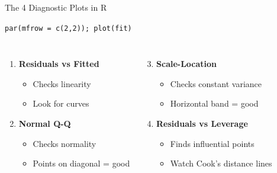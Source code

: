 \documentclass[aspectratio=169, 11pt]{beamer}
\begin{document}
\begin{frame}{The 4 Diagnostic Plots in R}

\texttt{par(mfrow = c(2,2)); plot(fit)}

\vspace{0.5em}
\begin{columns}
\begin{enumerate}
  \item \textbf{Residuals vs Fitted}
  \begin{itemize}
    \item[$\circ$] Checks linearity
    \item[$\circ$] Look for curves
  \end{itemize}

  \vspace{0.4em}
  \item \textbf{Normal Q-Q}
  \begin{itemize}
    \item[$\circ$] Checks normality
    \item[$\circ$] Points on diagonal = good
  \end{itemize}
\end{enumerate}

\begin{enumerate}
  \setcounter{enumi}{2}
  \item \textbf{Scale-Location}
  \begin{itemize}
    \item[$\circ$] Checks constant variance
    \item[$\circ$] Horizontal band = good
  \end{itemize}

  \vspace{0.4em}
  \item \textbf{Residuals vs Leverage}
  \begin{itemize}
    \item[$\circ$] Finds influential points
    \item[$\circ$] Watch Cook's distance lines
  \end{itemize}
\end{enumerate}
\end{columns}

\vspace{0.5em}
\centering
{}
\end{frame}
\end{document}

